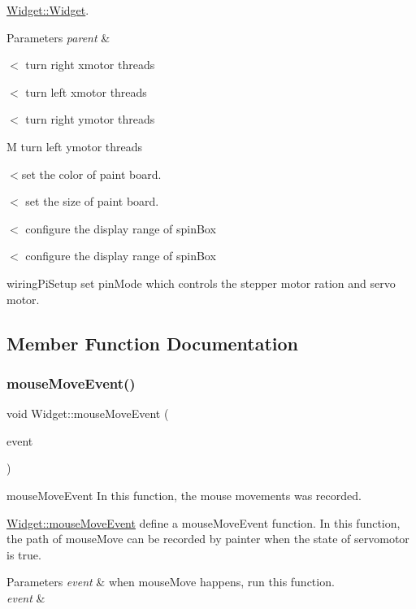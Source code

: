 \mbox{\hyperlink{class_widget_a29531c7f141e461322981b3b579d4590}{Widget\+::\+Widget}}. 


\begin{DoxyParams}{Parameters}
{\em parent} & \\
\hline
\end{DoxyParams}
$<$ turn right xmotor threads

$<$ turn left xmotor threads

$<$ turn right ymotor threads

M turn left ymotor threads

$<$set the color of paint board.

$<$ set the size of paint board.

$<$ configure the display range of spin\+Box

$<$ configure the display range of spin\+Box

wiring\+Pi\+Setup set pin\+Mode which controls the stepper motor ration and servo motor.

\subsection{Member Function Documentation}
\mbox{\label{class_widget_ae67612ab62d0a43c6ebd3759b883cdd2}} 
\subsubsection{\texorpdfstring{mouseMoveEvent()}{mouseMoveEvent()}}
{\footnotesize\ttfamily void Widget\+::mouse\+Move\+Event (\begin{DoxyParamCaption}\item[{Q\+Mouse\+Event $\ast$}]{event }\end{DoxyParamCaption})\hspace{0.3cm}{\ttfamily [protected]}}



mouse\+Move\+Event In this function, the mouse movements was recorded. 

\mbox{\hyperlink{class_widget_ae67612ab62d0a43c6ebd3759b883cdd2}{Widget\+::mouse\+Move\+Event}} define a mouse\+Move\+Event function. In this function, the path of mouse\+Move can be recorded by painter when the state of servomotor is true.


\begin{DoxyParams}{Parameters}
{\em event} & when mouse\+Move happens, run this function.\\
\hline
{\em event} & \\
\hline
\end{DoxyParams}
\mbox{\label{class_widget_a681594b94d8b48c7e7b669268f3baf81}} 
